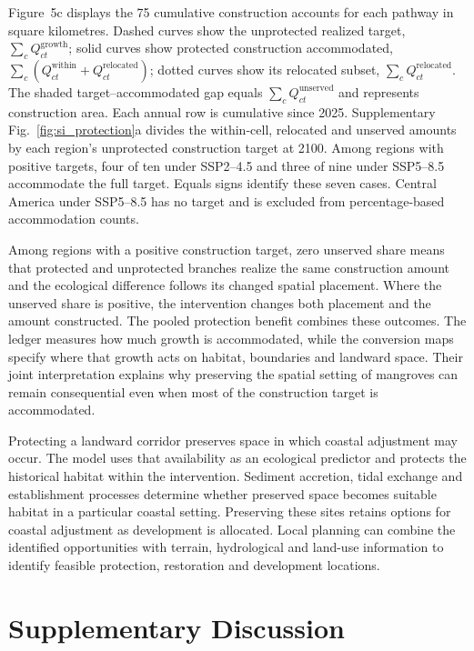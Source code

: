 Figure~5c displays the 75 cumulative construction accounts for each pathway in square kilometres. Dashed curves show the unprotected realized target, $\sum_c Q_{ct}^{\mathrm{growth}}$; solid curves show protected construction accommodated, $\sum_c(Q_{ct}^{\mathrm{within}}+Q_{ct}^{\mathrm{relocated}})$; dotted curves show its relocated subset, $\sum_c Q_{ct}^{\mathrm{relocated}}$. The shaded target--accommodated gap equals $\sum_c Q_{ct}^{\mathrm{unserved}}$ and represents construction area. Each annual row is cumulative since 2025. Supplementary Fig.~\ref{fig:si_protection}a divides the within-cell, relocated and unserved amounts by each region's unprotected construction target at 2100. Among regions with positive targets, four of ten under SSP2--4.5 and three of nine under SSP5--8.5 accommodate the full target. Equals signs identify these seven cases. Central America under SSP5--8.5 has no target and is excluded from percentage-based accommodation counts.

Among regions with a positive construction target, zero unserved share means that protected and unprotected branches realize the same construction amount and the ecological difference follows its changed spatial placement. Where the unserved share is positive, the intervention changes both placement and the amount constructed. The pooled protection benefit combines these outcomes. The ledger measures how much growth is accommodated, while the conversion maps specify where that growth acts on habitat, boundaries and landward space. Their joint interpretation explains why preserving the spatial setting of mangroves can remain consequential even when most of the construction target is accommodated.

Protecting a landward corridor preserves space in which coastal adjustment may occur. The model uses that availability as an ecological predictor and protects the historical habitat within the intervention. Sediment accretion, tidal exchange and establishment processes determine whether preserved space becomes suitable habitat in a particular coastal setting\cite{ref010,ref029,ref021}. Preserving these sites retains options for coastal adjustment as development is allocated. Local planning can combine the identified opportunities with terrain, hydrological and land-use information to identify feasible protection, restoration and development locations.


\section{Supplementary Discussion}
